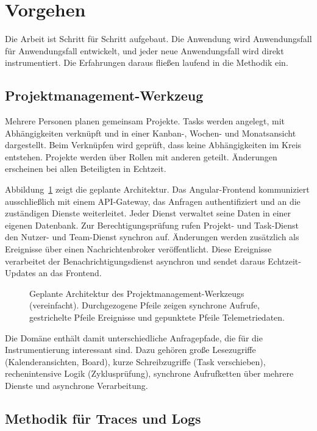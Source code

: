 \documentclass[11pt, a4paper]{article}
\begin{document}
\section{Vorgehen}\label{sec:vorgehen}

Die Arbeit ist Schritt für Schritt aufgebaut. Die Anwendung wird Anwendungsfall für Anwendungsfall entwickelt, und jeder neue Anwendungsfall wird direkt instrumentiert. Die Erfahrungen daraus fließen laufend in die Methodik ein.

\subsection{Projektmanagement-Werkzeug}

Mehrere Personen planen gemeinsam Projekte. Tasks werden angelegt, mit Abhängigkeiten verknüpft und in einer Kanban-, Wochen- und Monatsansicht dargestellt. Beim Verknüpfen wird geprüft, dass keine Abhängigkeiten im Kreis entstehen. Projekte werden über Rollen mit anderen geteilt. Änderungen erscheinen bei allen Beteiligten in Echtzeit.

Abbildung~\ref{fig:architektur} zeigt die geplante Architektur. Das Angular-Frontend kommuniziert ausschließlich mit einem API-Gateway, das Anfragen authentifiziert und an die zuständigen Dienste weiterleitet. Jeder Dienst verwaltet seine Daten in einer eigenen Datenbank. Zur Berechtigungsprüfung rufen Projekt- und Task-Dienst den Nutzer- und Team-Dienst synchron auf. Änderungen werden zusätzlich als Ereignisse über einen Nachrichtenbroker veröffentlicht. Diese Ereignisse verarbeitet der Benachrichtigungsdienst asynchron und sendet daraus Echtzeit-Updates an das Frontend.

\begin{figure}[htbp]
\centering
\resizebox{\textwidth}{!}{}
\caption{Geplante Architektur des Projektmanagement-Werkzeugs (vereinfacht). Durchgezogene Pfeile zeigen synchrone Aufrufe, gestrichelte Pfeile Ereignisse und gepunktete Pfeile Telemetriedaten.}
\label{fig:architektur}
\end{figure}

Die Domäne enthält damit unterschiedliche Anfragepfade, die für die Instrumentierung interessant sind. Dazu gehören große Lesezugriffe (Kalenderansichten, Board), kurze Schreibzugriffe (Task verschieben), rechenintensive Logik (Zyklusprüfung), synchrone Aufrufketten über mehrere Dienste und asynchrone Verarbeitung.

\subsection{Methodik für Traces und Logs}
\end{document}
